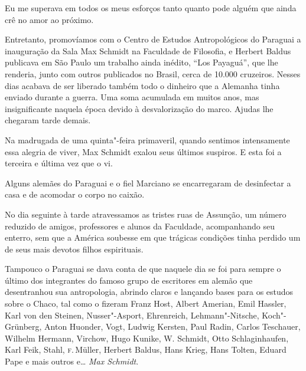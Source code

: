 Eu me superava em todos os meus esforços tanto quanto pode alguém que
ainda crê no amor ao próximo.

Entretanto, promovíamos com o Centro de Estudos Antropológicos do
Paraguai a inauguração da Sala Max Schmidt na Faculdade de Filosofia, e
Herbert Baldus publicava em São Paulo um trabalho ainda inédito, ``Los
Payaguá'', que lhe renderia, junto com outros publicados no Brasil,
cerca de 10.000 cruzeiros. Nesses dias acabava de ser liberado também
todo o dinheiro que a Alemanha tinha enviado durante a guerra. Uma soma
acumulada em muitos anos, mas insignificante naquela época devido à
desvalorização do marco. Ajudas lhe chegaram tarde demais.

Na madrugada de uma quinta"-feira primaveril, quando sentimos
intensamente essa alegria de viver, Max Schmidt exalou seus últimos
suspiros. E esta foi a terceira e última vez que o vi.

Alguns alemães do Paraguai e o fiel Marciano se encarregaram de
desinfectar a casa e de acomodar o corpo no caixão.

No dia seguinte à tarde atravessamos as tristes ruas de Assunção, um
número reduzido de amigos, professores e alunos da Faculdade,
acompanhando seu enterro, sem que a América soubesse em que trágicas
condições tinha perdido um de seus mais devotos filhos espirituais.

Tampouco o Paraguai se dava conta de que naquele dia se foi para sempre
o último dos integrantes do famoso grupo de escritores em alemão que
desentranhou sua antropologia, abrindo claros e lançando bases para os
estudos sobre o Chaco, tal como o fizeram Franz Host, Albert Amerian,
Emil Hassler, Karl von den Steinen, Nusser"-Asport, Ehrenreich,
Lehmann"-Nitsche, Koch"-Grünberg, Anton Huonder, Vogt, Ludwig Kersten,
Paul Radin, Carlos Teschauer, Wilhelm Hermann, Virchow, Hugo Kunike, W.
Schmidt, Otto Schlaginhaufen, Karl Feik, Stahl, \textsc{f}.\,Müller, Herbert
Baldus, Hans Krieg, Hans Tolten, Eduard Pape e mais outros e\ldots{} \textit{Max
Schmidt}.

\pagebreak
\thispagestyle{empty}

